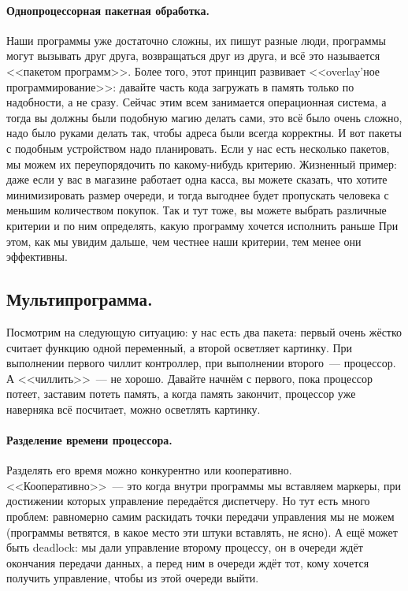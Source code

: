 \documentclass{article}
\begin{document}
    \paragraph{Однопроцессорная пакетная обработка.}
    Наши программы уже достаточно сложны, их пишут разные люди, программы могут вызывать друг друга, возвращаться друг из друга, и всё это называется <<пакетом программ>>. Более того, этот принцип развивает <<overlay'ное программирование>>: давайте часть кода загружать в память только по надобности, а не сразу. Сейчас этим всем занимается операционная система, а тогда вы должны были подобную магию делать сами, это всё было очень сложно, надо было руками делать так, чтобы адреса были всегда корректны. И вот пакеты с подобным устройством надо планировать. Если у нас есть несколько пакетов, мы можем их переупорядочить по какому-нибудь критерию. Жизненный пример: даже если у вас в магазине работает одна касса, вы можете сказать, что хотите минимизировать размер очереди, и тогда выгоднее будет пропускать человека с меньшим количеством покупок. Так и тут тоже, вы можете выбрать различные критерии и по ним определять, какую программу хочется исполнить раньше При этом, как мы увидим дальше, чем честнее наши критерии, тем менее они эффективны.
    \subsection{Мультипрограмма.}
    Посмотрим на следующую ситуацию: у нас есть два пакета: первый очень жёстко считает функцию одной переменный, а второй осветляет картинку. При выполнении первого чиллит контроллер, при выполнении второго~--- процессор. А <<чиллить>>~--- не хорошо. Давайте начнём с первого, пока процессор потеет, заставим потеть память, а когда память закончит, процессор уже наверняка всё посчитает, можно осветлять картинку.
    
    \paragraph{Разделение времени процессора.}
    Разделять его время можно конкурентно или кооперативно. <<Кооперативно>>~--- это когда внутри программы мы вставляем маркеры, при достижении которых управление передаётся диспетчеру. Но тут есть много проблем: равномерно самим раскидать точки передачи управления мы не можем (программы ветвятся, в какое место эти штуки вставлять, не ясно). А ещё может быть deadlock: мы дали управление второму процессу, он в очереди ждёт окончания передачи данных, а перед ним в очереди ждёт тот, кому хочется получить управление, чтобы из этой очереди выйти.
    
\end{document}
